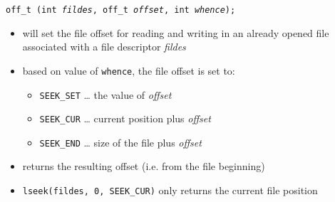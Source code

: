 \begin{itemize}
\end{itemize}



\begin{slide}
\texttt{off\_t (int \emph{fildes}, off\_t \emph{offset},
int \emph{whence});}
\begin{itemize}
\item will set the file offset for reading and writing in an already
opened file associated with a file descriptor \emph{fildes}
\item based on value of \texttt{whence}, the file offset is set to:
    \begin{itemize}
    \item \texttt{SEEK\_SET} \dots{} the value of \emph{offset}
    \item \texttt{SEEK\_CUR} \dots{} current position plus \emph{offset}
    \item \texttt{SEEK\_END} \dots{} size of the file plus \emph{offset}
    \end{itemize}
\item returns the resulting offset (i.e. from the file beginning)
\item \texttt{lseek(fildes, 0, SEEK\_CUR)} only returns the current file
position
\end{itemize}
\end{slide}

